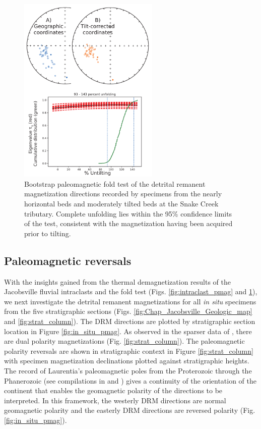 \begin{figure}
\centering
\includegraphics[width=0.6\textwidth]{figure/Zhang2024a/SC1_fold_test.pdf}
\caption[Jacobsville Formation fold test]{Bootstrap paleomagnetic fold test \citep{Tauxe1994a} of the detrital remanent magnetization directions recorded by specimens from the nearly horizontal beds and moderately tilted beds at the Snake Creek tributary. Complete unfolding lies within the 95\% confidence limits of the test, consistent with the magnetization having been acquired prior to tilting.}
\label{fig:fold_test}
\end{figure}

\subsection*{Paleomagnetic reversals}

With the insights gained from the thermal demagnetization results of the Jacobsville fluvial intraclasts and the fold test (Figs. \ref{fig:intraclast_pmag} and \ref{fig:fold_test}), we next investigate the detrital remanent magnetizations for all \textit{in situ} specimens from the five stratigraphic sections (Figs. \ref{fig:Chap_Jacobsville_Geologic_map} and \ref{fig:strat_column}). The DRM directions are plotted by stratigraphic section location in Figure \ref{fig:in_situ_pmag}. As observed in the sparser data of \cite{Roy1978a}, there are dual polarity magnetizations (Fig. \ref{fig:strat_column}). The paleomagnetic polarity reversals are shown in stratigraphic context in Figure \ref{fig:strat_column} with specimen magnetization declinations plotted against stratigraphic heights. The record of Laurentia's paleomagnetic poles from the Proterozoic through the Phanerozoic (see compilations in \cite{Torsvik2012a} and \cite{Swanson-Hysell2021c}) gives a continuity of the orientation of the continent that enables the geomagnetic polarity of the directions to be interpreted. In this framework, the westerly DRM directions are normal geomagnetic polarity and the easterly DRM directions are reversed polarity (Fig. \ref{fig:in_situ_pmag}). 

